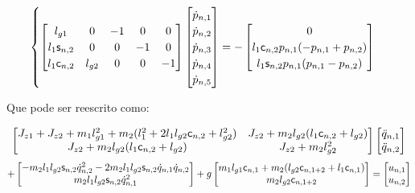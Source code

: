 \begin{itemize}
\begin{equation}
\begin{cases}
	\begin{bmatrix}
	l_{g1} & 0 & -1 & 0 & 0 \\
	l_1 \mathsf{s}_{n,2} & 0 & 0 & -1 & 0 \\
	l_1 \mathsf{c}_{n,2} & l_{g2}  & 0 & 0 & -1 \\
	\end{bmatrix}
	\begin{bmatrix}
	\dot{p}_{n,1} \\
	\dot{p}_{n,2} \\
	\dot{p}_{n,3} \\
	\dot{p}_{n,4} \\
	\dot{p}_{n,5} \\
	\end{bmatrix}
	=
	-
	\begin{bmatrix}
	0 \\
	l_1 \mathsf{c}_{n,2} p_{n,1} (-p_{n,1}+p_{n,2}) \\
	l_1 \mathsf{s}_{n,2} p_{n,1} (p_{n,1}-p_{n,2}) \\
	\end{bmatrix}

	\end{cases}
\end{equation}

Que pode ser reescrito como:

$$
\begin{bmatrix}
J_{z1} + J_{z2} + m_1 l_{g1}^2 + m_2 (l_1^2 + 2 l_1 l_{g2} \mathsf{c}_{n,2} + l_{g2}^2) & J_{z2} + m_2 l_{g2} (l_1 \mathsf{c}_{n,2} + l_{g2}) \\
J_{z2} + m_2 l_{g2} (l_1 \mathsf{c}_{n,2} + l_{g2}) & J_{z2} + m_2 l_{g2}^2
\end{bmatrix}
\begin{bmatrix}
\ddot{q}_{n,1} \\
\ddot{q}_{n,2} \\
\end{bmatrix}
$$
$$
+
\begin{bmatrix}
- m_2 l_1 l_{g2} \mathsf{s}_{n,2} \dot{q}_{n,2}^2 -2 m_2 l_1 l_{g2} \mathsf{s}_{n,2} \dot{q}_{n,1}  \dot{q} _{n,2} \\
m_2 l_1 l_{g2} \mathsf{s}_{n,2} \dot{q}_{n,1}^2 \\
\end{bmatrix}
+
g \begin{bmatrix}
m_1 l_{g1} \mathsf{c}_{n,1} + m_2 (l_{g2} \mathsf{c}_{n,1+2} + l_1 \mathsf{c}_{n,1}) \\
 m_2 l_{g2} \mathsf{c}_{n,1+2} \\
\end{bmatrix}
=
\begin{bmatrix}
u_{n,1} \\
u_{n,2} \\
\end{bmatrix}
$$


\end{itemize}
